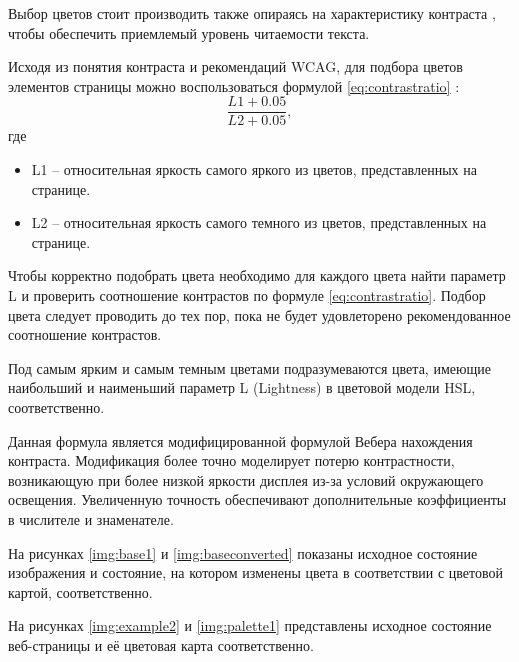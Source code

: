 Выбор цветов стоит производить также опираясь на характеристику контраста \cite{contrast}, чтобы обеспечить приемлемый уровень читаемости текста.

Исходя из понятия контраста и рекомендаций WCAG, для подбора цветов элементов страницы можно воспользоваться формулой  \ref{eq:contrastratio} \cite{wcagcontrast}:
\begin{equation}
	\label{eq:contrastratio}
	\frac{L1 + 0.05}{L2 + 0.05},
\end{equation}
где
\begin{itemize}
	\item L1 -- относительная яркость самого яркого из цветов, представленных на странице.
	\item L2 -- относительная яркость самого темного из цветов, представленных на странице.
\end{itemize}

Чтобы корректно подобрать цвета необходимо для каждого цвета найти параметр L и проверить соотношение контрастов по формуле \ref{eq:contrastratio}. Подбор цвета следует проводить до тех пор, пока не будет удовлеторено рекомендованное соотношение контрастов.

Под самым ярким и самым темным цветами подразумеваются цвета, имеющие наибольший и наименьший параметр L (Lightness) в цветовой модели HSL, соответственно.

Данная формула является модифицированной формулой Вебера \cite{weber} нахождения контраста. Модификация более точно моделирует потерю контрастности, возникающую при более низкой яркости дисплея из-за условий окружающего освещения. Увеличенную точность обеспечивают дополнительные коэффициенты в числителе и знаменателе.

На рисунках \ref{img:base1} и \ref{img:baseconverted} показаны исходное состояние изображения и состояние, на котором изменены цвета в соответствии с цветовой картой, соответственно.

На рисунках \ref{img:example2} и \ref{img:palette1} представлены исходное состояние веб-страницы и её цветовая карта соответственно.

\clearpage


\clearpage



